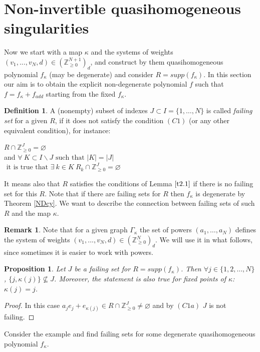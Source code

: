\documentclass[reqno,12pt]{amsart}
\numberwithin{equation}{section}
\theoremstyle{plain}
\newtheorem{proposition}[theorem]{Proposition}
\theoremstyle{definition}
\newtheorem{remark}[theorem]{Remark}
\newtheorem{definition}[theorem]{Definition}
\newcommand{\ZZ}{{\mathbb{Z}}}
\begin{document}
\section{Non-invertible quasihomogeneous singularities}
Now we start with a map $\kappa$ and the systems of weights $(v_1,...,v_N,d)\in(\ZZ_{\ge 0}^{N+1})_d$, and construct by them quasihomogeneous polynomial $f_\kappa$ (may be degenerate) and consider $R=supp(f_\kappa)$. In this section our aim is to obtain the explicit non-degenerate polynomial $f$ such that $f = f_\kappa + f_{add}$ starting from the fixed $f_\kappa$.  
\begin{definition}
A (nonempty) subset of indexes $J \subset I = \{1,\dots, N\}$ is called \emph{failing set} for a given $R$, if it does not satisfy the condition $(C1)$ (or any other equivalent condition), for instance:

\begin{list}{}{}
\item[(NC1):]  
\quad $R\cap \ZZ_{\geq 0}^J = \varnothing$\\
\hspace*{1.6cm}and $\forall\ K\subset I\backslash J\text{ such that }|K|=|J|$\\
\hspace*{5cm}$\text{ it is true that }\exists\ k\in K\ R_k\cap \ZZ_{\geq 0}^J = \varnothing$
\end{list}
\end{definition}

It means also that $R$ satisfies the conditions of Lemma $\ref{t2.1}$ if there is no failing set for this $R$. Note that if there are failing sets for $R$ then $f_\kappa$ is degenerate by Theorem \ref{NDcy}. We want to describe the connection between failing sets of such $R$ and the map $\kappa$.
\begin{remark}
    Note that for a given graph $\Gamma_\kappa$ the set of powers $(a_1,\dots,a_N)$ defines the system of weights $(v_1,...,v_N,d)\in(\ZZ_{\ge 0}^N)_d$. We will use it in what follows, since sometimes it is easier to work with powers.
\end{remark}
\begin{proposition}
    Let $J$ be a failing set for $R = supp(f_\kappa)$. Then $\forall j \in \{1,2,\dots,N\}$, $\{j, \kappa(j)\} \nsubseteq J$. Moreover, the statement is also true for fixed points of $\kappa$: $\kappa(j) = j$.
\end{proposition}
\begin{proof}
    In this case $a_je_j+e_{\kappa(j)} \in R\cap \ZZ_{\geq 0}^J \neq \varnothing$ and by $(C1a)$ $J$ is not failing.
\end{proof}
Consider the example and find failing sets for some degenerate quasihomogeneous polynomial $f_\kappa$.
\end{document}

